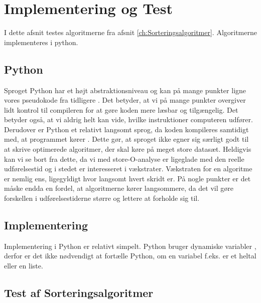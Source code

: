 \chapter{Implementering og Test}
\label{ch:Implementering og test af Algoritmerne}

I dette afsnit testes algoritmerne fra afsnit \ref{ch:Sorteringsalgoritmer}. Algoritmerne implementeres i python.

\section{Python}
\label{sec:Python}

Sproget Python har et højt abstraktionsniveau og kan på mange punkter ligne vores pseudokode fra tidligere \cite[s. 68]{aogd}. Det betyder, at vi på mange punkter overgiver lidt kontrol til compileren for at gøre koden mere læsbar og tilgængelig. Det betyder også, at vi aldrig helt kan vide, hvilke instruktioner computeren udfører. Derudover er Python et relativt langsomt sprog, da koden kompileres samtidigt med, at programmet kører \cite{what-is-python}. Dette gør, at sproget ikke egner sig særligt godt til at skrive optimerede algoritmer, der skal køre på meget store datasæt. Heldigvis kan vi se bort fra dette, da vi med store-O-analyse er ligeglade med den reelle udførelsestid og i stedet er interesseret i vækstrater. Vækstraten for en algoritme er nemlig ens, ligegyldigt hvor langsomt hvert skridt er. På nogle punkter er det måske endda en fordel, at algoritmerne kører langsommere, da det vil gøre forskellen i udførelsestiderne større og lettere at forholde sig til. 


\section{Implementering}
\label{sec:Implementering}

Implementering i Python er relativt simpelt. Python bruger dynamiske variabler \cite{what-is-python}, derfor er det ikke nødvendigt at fortælle Python, om en variabel f.eks. er et heltal eller en liste. 


\section{Test af Sorteringsalgoritmer}
\label{sec:Test af Sorteringsalgoritmer}


